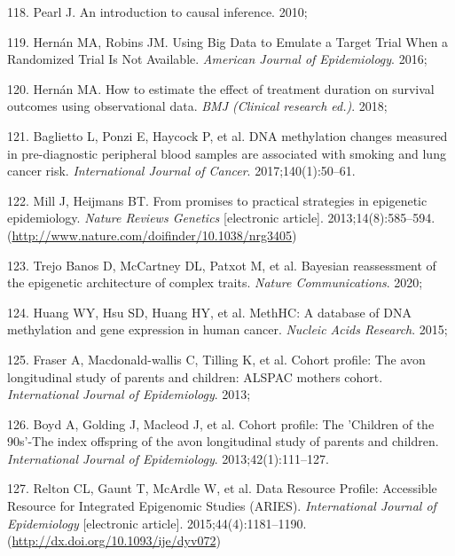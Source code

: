 \documentclass[11pt,oneside]{bristolthesis}
\newenvironment{cslreferences}%
  {}%
  {\par}
\begin{document}
\begin{cslreferences}
\leavevmode\hypertarget{ref-Pearl2010}{}%
118. Pearl J. An introduction to causal inference. 2010;

\leavevmode\hypertarget{ref-Hernan2016}{}%
119. Hernán MA, Robins JM. Using Big Data to Emulate a Target Trial When a Randomized Trial Is Not Available. \emph{American Journal of Epidemiology}. 2016;

\leavevmode\hypertarget{ref-Hernan2018}{}%
120. Hernán MA. How to estimate the effect of treatment duration on survival outcomes using observational data. \emph{BMJ (Clinical research ed.)}. 2018;

\leavevmode\hypertarget{ref-Baglietto2017}{}%
121. Baglietto L, Ponzi E, Haycock P, et al. DNA methylation changes measured in pre-diagnostic peripheral blood samples are associated with smoking and lung cancer risk. \emph{International Journal of Cancer}. 2017;140(1):50--61.

\leavevmode\hypertarget{ref-Mill2013}{}%
122. Mill J, Heijmans BT. From promises to practical strategies in epigenetic epidemiology. \emph{Nature Reviews Genetics} {[}electronic article{]}. 2013;14(8):585--594. (\url{http://www.nature.com/doifinder/10.1038/nrg3405})

\leavevmode\hypertarget{ref-TrejoBanos2020}{}%
123. Trejo Banos D, McCartney DL, Patxot M, et al. Bayesian reassessment of the epigenetic architecture of complex traits. \emph{Nature Communications}. 2020;

\leavevmode\hypertarget{ref-Huang2015}{}%
124. Huang WY, Hsu SD, Huang HY, et al. MethHC: A database of DNA methylation and gene expression in human cancer. \emph{Nucleic Acids Research}. 2015;

\leavevmode\hypertarget{ref-Fraser2013}{}%
125. Fraser A, Macdonald-wallis C, Tilling K, et al. Cohort profile: The avon longitudinal study of parents and children: ALSPAC mothers cohort. \emph{International Journal of Epidemiology}. 2013;

\leavevmode\hypertarget{ref-Boyd2013}{}%
126. Boyd A, Golding J, Macleod J, et al. Cohort profile: The 'Children of the 90s'-The index offspring of the avon longitudinal study of parents and children. \emph{International Journal of Epidemiology}. 2013;42(1):111--127.

\leavevmode\hypertarget{ref-Relton2015-aries}{}%
127. Relton CL, Gaunt T, McArdle W, et al. Data Resource Profile: Accessible Resource for Integrated Epigenomic Studies (ARIES). \emph{International Journal of Epidemiology} {[}electronic article{]}. 2015;44(4):1181--1190. (\url{http://dx.doi.org/10.1093/ije/dyv072})


\end{cslreferences}
\end{document}
